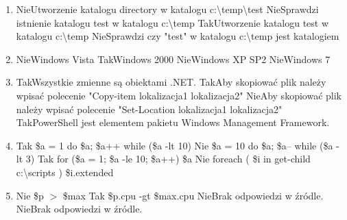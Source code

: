 \begin{enumerate}
		{Tak}{Polecenie ls jest aliasem polecenia Get-Children.}%
		{Nie}{PowerShell nie posiada modułów i przystawek pozwalających na rozszerzanie powłoki poprzez dodawanie nowych cmdletów.}%
		{Nie}{W systemie operacyjnym Windows XP SP2 domyślnie zainstalowaną wersją PowerShella jest wersja "PowerShell v2"}%
		{Tak}{PowerShell pozwala na przetwarzanie potokowe, które pozwala na przekazywanie obiektu z jednego cmdletu do drugiego, bez potrzeby korzystania z parsowania tekstu czy zmiany formatowania.}
		\newpage
		\item {}%
		{Nie}{Utworzenie katalogu directory w katalogu c:\textbackslash temp\textbackslash test}%
		{Nie}{Sprawdzi istnienie katalogu test w katalogu c:\textbackslash temp}%
		{Tak}{Utworzenie katalogu test w katalogu c:\textbackslash temp}%
		{Nie}{Sprawdzi czy "test" w katalogu c:\textbackslash temp jest katalogiem}
		\item {}%
		{Nie}{Windows Vista}%
		{Tak}{Windows 2000}%
		{Nie}{Windows XP SP2}%
		{Nie}{Windows 7}
		\item {}%
		{Tak}{Wszystkie zmienne są obiektami .NET.}%
		{Tak}{Aby skopiować plik należy wpisać polecenie "Copy-item lokalizacja1 lokalizacja2"}%
		{Nie}{Aby skopiować plik należy wpisać polecenie "Set-Location lokalizacja1 lokalizacja2"}%
		{Tak}{PowerShell jest elementem pakietu Windows Management Framework.}
		\item {}%
		{Tak}{ \$a = 1 do { \$a; \$a++ } while (\$a -lt 10) }%
		{Nie}{ \$a = 10 do { \$a; \$a-- } while (\$a -lt 3) }%
		{Tak}{ for (\$a = 1; \$a -le 10; \$a++) { \$a } }%
		{Nie}{ foreach ( \$i in get-child c:\textbackslash scripts ) {\$i.extended} }
		\item {}%
		{Nie}{ \$p $ > $ \$max }%
		{Tak}{ \$p.cpu -gt \$max.cpu }%
		{Nie}{Brak odpowiedzi w źródle.}%
		{Nie}{Brak odpowiedzi w źródle.}
		
	\end{enumerate}